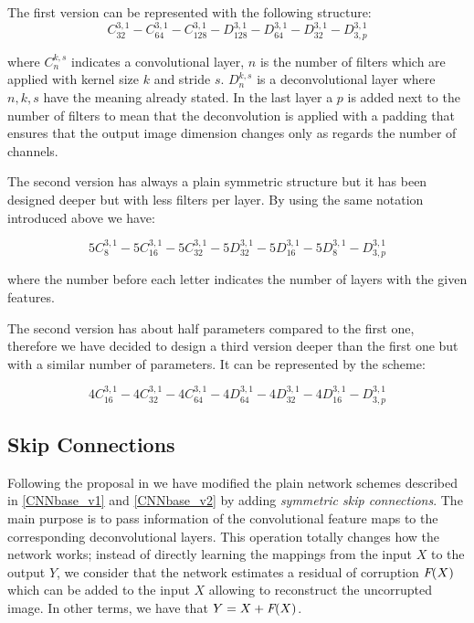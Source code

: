 \documentclass[12pt,a4paper]{article}
\begin{document}
The first version can be represented with the following structure: 
\begin{equation}
C_{32}^{3,1} - C_{64}^{3,1} - C_{128}^{3,1} - D_{128}^{3,1} - D_{64}^{3,1} - D_{32}^{3,1} - D_{3,p}^{3,1} 
\label{CNNbase_v1}
\end{equation}

where $C_n^{k,s}$ indicates a convolutional layer, $n$ is the number of filters which are applied with kernel size $k$ and stride $s$. $D_n^{k,s}$ is a deconvolutional layer where $n, k, s$ have the meaning already stated. In the last layer a $p$ is added next to the number of filters to mean that the deconvolution is applied with a padding that ensures that the output image dimension changes only as regards the number of channels.

The second version has always a plain symmetric structure but it has been designed deeper but with less filters per layer. By using the same notation introduced above we have: 

\begin{equation}
5C_{8}^{3,1} - 5C_{16}^{3,1} - 5C_{32}^{3,1} - 5D_{32}^{3,1} - 5D_{16}^{3,1} - 5D_{8}^{3,1} - D_{3,p}^{3,1} 
\label{CNNbase_v2}
\end{equation}

where the number before each letter indicates the number of layers with the given features. 

The second version has about half parameters compared to the first one, therefore we have decided to design a third version deeper than the first one but with a similar number of parameters. It can be represented by the scheme:

\begin{equation}
4C_{16}^{3,1} - 4C_{32}^{3,1} - 4C_{64}^{3,1} - 4D_{64}^{3,1} - 4D_{32}^{3,1} - 4D_{16}^{3,1} - D_{3,p}^{3,1} 
\label{CNNbase_v2}
\end{equation}

\subsection{Skip Connections}

Following the proposal in \cite{M&Al} we have modified the plain network schemes described in \eqref{CNNbase_v1} and \eqref{CNNbase_v2} by adding \textit{symmetric skip connections}. The main purpose is to pass information of the convolutional feature maps to the corresponding deconvolutional layers. This operation totally changes how the network works; instead of directly learning the mappings from the input $X$ to the output $Y$, we consider that the network estimates a residual of corruption $\emph{F}(X)$ which can be added to the input $X$ allowing to reconstruct the uncorrupted image. In other terms, we have that $Y = X + \emph{F}(X)$.
\end{document}
